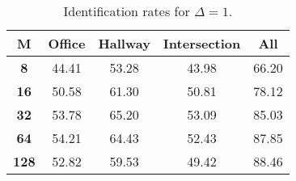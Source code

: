 \begin{table}[h]
    \footnotesize
    \centering
    \begin{tabular}{|c|c|c|c|l|}    
    \hline
    {\bf M} & {\bf Office} & {\bf Hallway} & {\bf Intersection} &     \multicolumn{1}{c|}{{\bf All}} \\ \hline
    {\bf 8} & 44.41 & 53.28 & 43.98 & 66.20 \\ \hline
    {\bf 16} & 50.58 & 61.30 & 50.81 & 78.12 \\ \hline
    {\bf 32} & 53.78 & 65.20 & 53.09 & 85.03 \\ \hline
    {\bf 64} & 54.21 & 64.43 & 52.43 & 87.85 \\ \hline
    {\bf 128} & 52.82 & 59.53 & 49.42 & 88.46 \\ \hline
    \end{tabular}
    \caption{Identification rates for $\Delta = 1$.}    
    \label{tab:identify_speakers_mit_19_1}
\end{table}
